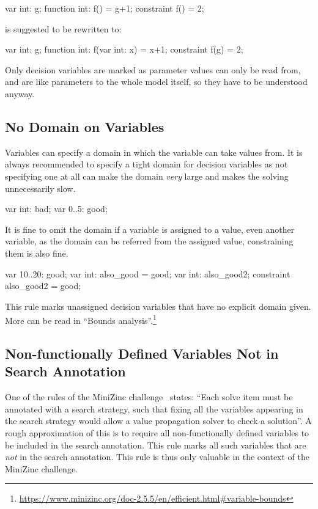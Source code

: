 \documentclass[a4paper,12pt]{article}
\begin{document}
\begin{mznnobreak}
var int: g;
function int: f() = g+1;
constraint f() = 2;
\end{mznnobreak}
is suggested to be rewritten to:
\begin{mznnobreak}
var int: g;
function int: f(var int: x) = x+1;
constraint f(g) = 2;
\end{mznnobreak}

Only decision variables are marked as parameter values can only be read from, and are like
parameters to the whole model itself, so they have to be understood anyway.

\subsection{No Domain on Variables}\label{sec:rule:nodomain}
Variables can specify a domain in which the variable can take values from. It is always
recommended to specify a tight domain for decision variables as not specifying one at all
can make the domain \emph{very} large and makes the solving unnecessarily slow.
\begin{mznnobreak}
var int: bad;
var 0..5: good;
\end{mznnobreak}
It is fine to omit the domain if a variable is assigned to a value, even another variable,
as the domain can be referred from the assigned value, constraining them is also fine.
\begin{mznnobreak}
var 10..20: good;
var int: also_good = good;
var int: also_good2;
constraint also_good2 = good;
\end{mznnobreak}
This rule marks unassigned decision variables that have no explicit domain given.
More can be read in ``Bounds analysis''.\footnote{\url{https://www.minizinc.org/doc-2.5.5/en/efficient.html\#variable-bounds}}

\subsection{Non-functionally Defined Variables Not in Search Annotation}\label{sec:rule:nonfuncdef}
One of the rules of the MiniZinc challenge~\cite{MZN:Challenge} states: ``Each solve item
must be annotated with a search strategy, such that fixing all the variables appearing in
the search strategy would allow a value propagation solver to check a solution''. A rough
approximation of this is to require all non-functionally defined variables to be included
in the search annotation. This rule marks all such variables that are \emph{not} in the
search annotation. This rule is thus only valuable in the context of the MiniZinc
challenge.
\end{document}
